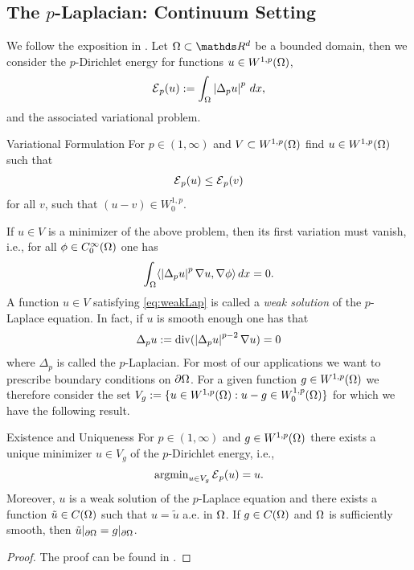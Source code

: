 \subsection{The $p$-Laplacian: Continuum Setting}\label{sec:pLapcont}
We follow the exposition in \cite{lindqvist2017notes}. Let $\domain\subset\R^d$ be a bounded domain, then 
we consider the $p$-Dirichlet energy for functions $u\in W^{1,p}(\Omega)$,
%
\begin{align}\label{eq:DirichletEnergy}
\mathcal{E}{}_p(u) := \int_\Omega \left|\Delta_p u\right|^p \, dx,
\end{align}
%
and the associated variational problem.
%
\begin{problem}{Variational Formulation}{}
For $p\in (1,\infty)$ and $V\subset W^{1,p}(\Omega)$ find $u\in W^{1,p}(\Omega)$ such that
%
\begin{align*}
\mathcal{E}{}_p(u) \leq \mathcal{E}{}_p(v)
\end{align*}
%
for all $v$, such that $(u-v)\in W^{1,p}_0$.
\end{problem}
%
If $u\in V$ is a minimizer of the above problem, then its first variation must vanish, i.e., for all $\phi\in C^\infty_0(\Omega)$ one has
%
\begin{align}\label{eq:weakLap}
\int_\Omega \langle \left|\Delta_p u\right|^p \nabla u, \nabla \phi \rangle \, dx = 0.
\end{align}
%
A function $u\in V$ satisfying \cref{eq:weakLap} is called a \emph{weak solution} of the $p$-Laplace equation. In fact, if $u$ 
is smooth enough one has that
%
\begin{align}\label{eq:strongLap}
\Delta_p u := \operatorname{div}(\left|\Delta_p u\right|^{p-2} \nabla u) = 0
\end{align}
%
where $\Delta_p$ is called the $p$-Laplacian. For most of our applications we want to prescribe boundary conditions on $\partial \Omega$. 
For a given function $g\in W^{1,p}(\Omega)$ we therefore consider the set 
$V_g := \{u\in W^{1,p}(\Omega): u-g \in W^{1,p}_0(\Omega)\}$ for which we have the following result.
%
\begin{theorem}{Existence and Uniqueness}{}
For $p\in (1,\infty)$ and $g\in W^{1,p}(\Omega)$ there exists a unique minimizer $u\in V_g$ of the $p$-Dirichlet energy, i.e.,
%
\begin{align*}
\operatorname{argmin}_{u\in V_g} \mathcal{E}{}_p(u) = u.
\end{align*}
%
Moreover, $u$ is a weak solution of the $p$-Laplace equation and there exists a function $\tilde{u}\in C(\Omega)$ such that
$u = \tilde{u}$ a.e. in $\Omega$. If $g\in C(\Omega)$ and $\Omega$ is sufficiently smooth, then 
$\tilde{u}\vert_{\partial \Omega} = g\vert_{\partial \Omega}$.
\end{theorem}
%
%
\begin{proof}
The proof can be found in \cite[Thm. 2.16]{lindqvist2017notes}.
\end{proof}
%
%
